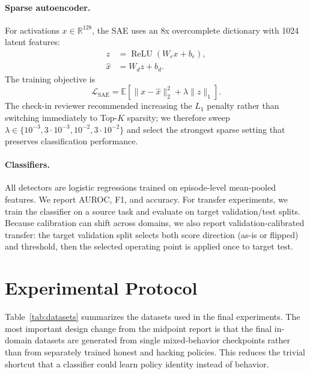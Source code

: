 \documentclass[11pt]{article}
\newcommand{\auroc}{AUROC}
\newcommand{\fone}{F1}
\begin{document}
\paragraph{Sparse autoencoder.}
For activations $x \in \mathbb{R}^{128}$, the SAE uses an 8x overcomplete dictionary with 1024 latent features:
\begin{align}
  z &= \operatorname{ReLU}(W_e x + b_e),\\
  \hat{x} &= W_d z + b_d.
\end{align}
The training objective is
\begin{equation}
  \mathcal{L}_{\text{SAE}} =
  \mathbb{E}\left[\|x-\hat{x}\|_2^2 + \lambda \|z\|_1\right].
\end{equation}
The check-in reviewer recommended increasing the $L_1$ penalty rather than switching immediately to Top-$K$ sparsity; we therefore sweep $\lambda \in \{10^{-3},3\cdot10^{-3},10^{-2},3\cdot10^{-2}\}$ and select the strongest sparse setting that preserves classification performance.

\paragraph{Classifiers.}
All detectors are logistic regressions trained on episode-level mean-pooled features. We report \auroc{}, \fone{}, and accuracy. For transfer experiments, we train the classifier on a source task and evaluate on target validation/test splits. Because calibration can shift across domains, we also report validation-calibrated transfer: the target validation split selects both score direction (as-is or flipped) and threshold, then the selected operating point is applied once to target test.

\section{Experimental Protocol}

Table~\ref{tab:datasets} summarizes the datasets used in the final experiments. The most important design change from the midpoint report is that the final in-domain datasets are generated from single mixed-behavior checkpoints rather than from separately trained honest and hacking policies. This reduces the trivial shortcut that a classifier could learn policy identity instead of behavior.
\end{document}
